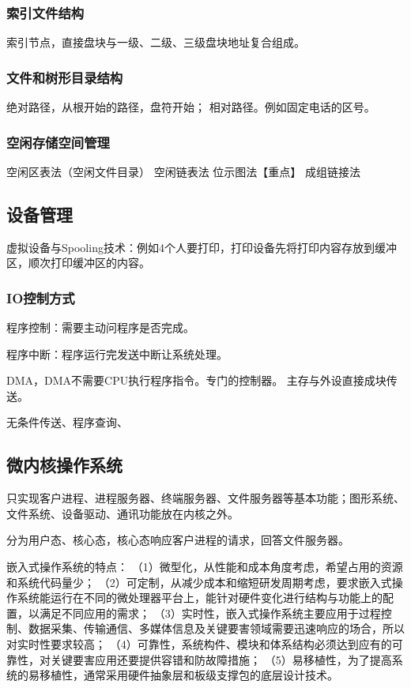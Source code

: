 \documentclass[UTF8]{../computerUniverse}
\begin{document}
\subsubsection{索引文件结构}

索引节点，直接盘块与一级、二级、三级盘块地址复合组成。

\subsubsection{文件和树形目录结构}
绝对路径，从根开始的路径，盘符开始；
相对路径。例如固定电话的区号。

\subsubsection{空闲存储空间管理}

空闲区表法（空闲文件目录）
空闲链表法
位示图法【重点】
成组链接法


\subsection{设备管理}

虚拟设备与Spooling技术：例如4个人要打印，打印设备先将打印内容存放到缓冲区，顺次打印缓冲区的内容。

\subsubsection{IO控制方式}

程序控制：需要主动问程序是否完成。

程序中断：程序运行完发送中断让系统处理。

DMA，DMA不需要CPU执行程序指令。专门的控制器。
主存与外设直接成块传送。

无条件传送、程序查询、





\subsection{微内核操作系统}
只实现客户进程、进程服务器、终端服务器、文件服务器等基本功能；图形系统、文件系统、设备驱动、通讯功能放在内核之外。

分为用户态、核心态，核心态响应客户进程的请求，回答文件服务器。


嵌入式操作系统的特点：
（1）微型化，从性能和成本角度考虑，希望占用的资源和系统代码量少；
（2）可定制，从减少成本和缩短研发周期考虑，要求嵌入式操作系统能运行在不同的微处理器平台上，能针对硬件变化进行结构与功能上的配置，以满足不同应用的需求；
（3）实时性，嵌入式操作系统主要应用于过程控制、数据采集、传输通信、多媒体信息及关键要害领域需要迅速响应的场合，所以对实时性要求较高；
（4）可靠性，系统构件、模块和体系结构必须达到应有的可靠性，对关键要害应用还要提供容错和防故障措施；
（5）易移植性，为了提高系统的易移植性，通常采用硬件抽象层和板级支撑包的底层设计技术。 
\end{document}
